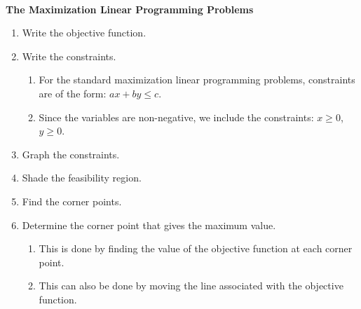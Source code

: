 \begin{summarybox}
    ~\\
    \textbf{The Maximization Linear Programming Problems}
    \begin{enumerate}
        \item Write the objective function.
        \item Write the constraints.
              \begin{enumerate}
                  \item For the standard maximization linear programming problems, constraints are of the form: $ax + by \leq c$.
                  \item Since the variables are non-negative, we include the constraints: $x \geq 0$, $y \geq 0$.
              \end{enumerate}
        \item Graph the constraints.
        \item Shade the feasibility region.
        \item Find the corner points.
        \item Determine the corner point that gives the maximum value.
              \begin{enumerate}
                  \item This is done by finding the value of the objective function at each corner point.
                  \item This can also be done by moving the line associated with the objective function.
              \end{enumerate}
    \end{enumerate}

\end{summarybox}